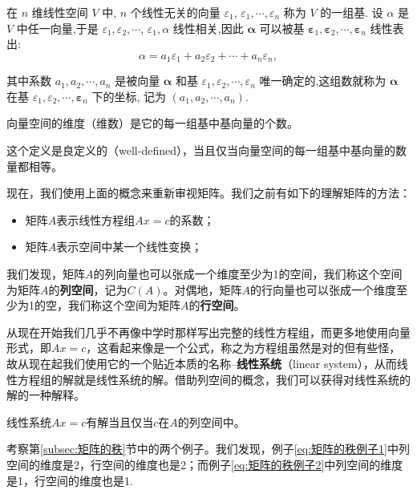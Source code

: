 \vspace{0.3cm}

在 $n$ 维线性空间 $V$ 中, $n$ 个线性无关的向量 $\varepsilon_1$, $\varepsilon_1, \cdots, \varepsilon_n$ 称为 $V$ 的一组基. 设 $\alpha$ 是 $V$ 中任一向量,于是 $\varepsilon_1, \varepsilon_2, \cdots$, $\varepsilon_1, \alpha$ 线性相关,因此 $\boldsymbol{\alpha}$ 可以被基 $\boldsymbol{\varepsilon}_1, \boldsymbol{\varepsilon}_2, \cdots, \boldsymbol{\varepsilon}_n$ 线性表出:
$$
\alpha=a_1 \varepsilon_1+a_2 \varepsilon_2+\cdots+a_n \varepsilon_n,
$$

其中系数 $a_1, a_2, \cdots, a_n$ 是被向量 $\boldsymbol{\alpha}$ 和基 $\varepsilon_1, \varepsilon_2, \cdots, \varepsilon_n$ 唯一确定的,这组数就称为 $\boldsymbol{\alpha}$ 在基 $\varepsilon_1, \varepsilon_2, \cdots, \boldsymbol{\varepsilon}_n$ 下的坐标, 记为 $\left(a_1, a_2, \cdots, a_n\right)$.

\begin{definition}[向量空间的维度]
    向量空间的维度（维数）是它的每一组基中基向量的个数。
\end{definition}

这个定义是良定义的（well-defined），当且仅当向量空间的每一组基中基向量的数量都相等。

现在，我们使用上面的概念来重新审视矩阵。我们之前有如下的理解矩阵的方法：

\begin{itemize}
    \item 矩阵$A$表示线性方程组$Ax=c$的系数；
    \item 矩阵$A$表示空间中某一个线性变换；
\end{itemize}

我们发现，矩阵$A$的列向量也可以张成一个维度至少为1的空间，我们称这个空间为矩阵$A$的\textcolor{third}{\bf 列空间}，记为$C(A)$。对偶地，矩阵$A$的行向量也可以张成一个维度至少为1的空，我们称这个空间为矩阵$A$的\textcolor{third}{\bf 行空间}。

从现在开始我们几乎不再像中学时那样写出完整的线性方程组，而更多地使用向量形式，即$Ax=c$，这看起来像是一个公式，称之为方程组虽然是对的但有些怪，故从现在起我们使用它的一个贴近本质的名称--\textcolor{third}{\bf 线性系统}（linear system），从而线性方程组的解就是线性系统的解。借助列空间的概念，我们可以获得对线性系统的解的一种解释。

\begin{theorem}
    线性系统$Ax=c$有解当且仅当$c$在$A$的列空间中。
\end{theorem}

考察第\ref{subsec:矩阵的秩}节中的两个例子。我们发现，例子\ref{eq:矩阵的秩例子1}中列空间的维度是2，行空间的维度也是2；而例子\ref{eq:矩阵的秩例子2}中列空间的维度是1，行空间的维度也是1.

